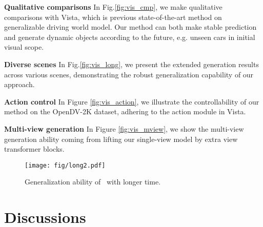 \noindent\textbf{Qualitative comparisons} In Fig.\ref{fig:vis_cmp}, we make qualitative comparisons with Vista, which is previous state-of-the-art method on generalizable driving world model. Our method can both make stable prediction and generate dynamic objects according to the future, e.g. unseen cars in initial visual scope.


\noindent\textbf{Diverse scenes}
In Fig.\ref{fig:vis_long}, we present the extended generation results across various scenes, demonstrating the robust generalization capability of our approach.

\noindent\textbf{Action control}
In Figure \ref{fig:vis_action}, we illustrate the controllability of our method on the OpenDV-2K dataset, adhering to the action module in Vista.

\noindent\textbf{Multi-view generation}
In Figure \ref{fig:vis_mview}, we show the multi-view generation ability coming from lifting our single-view model by extra view transformer blocks.

\begin{figure*}[t]
  \centering
   \texttt{[image: fig/long2.pdf]}
   \caption{Generalization ability of \ourmethod\ with longer time.}
   \label{fig:vis_long2}
\end{figure*}





\section{Discussions}
